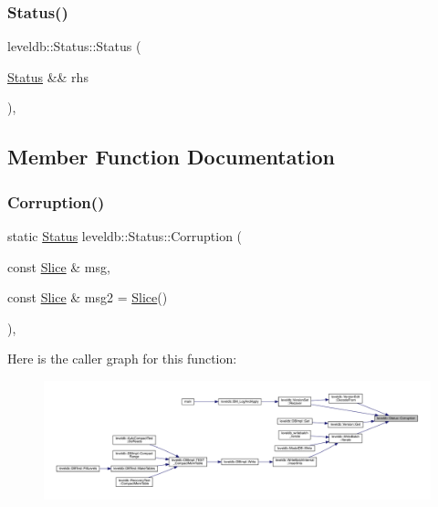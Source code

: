 \subsubsection{\texorpdfstring{Status()}{Status()}\hspace{0.1cm}{\footnotesize\ttfamily [3/3]}}
{\footnotesize\ttfamily leveldb\+::\+Status\+::\+Status (\begin{DoxyParamCaption}\item[{\mbox{\hyperlink{classleveldb_1_1_status}{Status}} \&\&}]{rhs }\end{DoxyParamCaption})\hspace{0.3cm}{\ttfamily [inline]}, {\ttfamily [noexcept]}}



\subsection{Member Function Documentation}
\mbox{\label{classleveldb_1_1_status_a755b1ee5b0029cf9ea1128f1cdff5855}} 
\subsubsection{\texorpdfstring{Corruption()}{Corruption()}}
{\footnotesize\ttfamily static \mbox{\hyperlink{classleveldb_1_1_status}{Status}} leveldb\+::\+Status\+::\+Corruption (\begin{DoxyParamCaption}\item[{const \mbox{\hyperlink{classleveldb_1_1_slice}{Slice}} \&}]{msg,  }\item[{const \mbox{\hyperlink{classleveldb_1_1_slice}{Slice}} \&}]{msg2 = {\ttfamily \mbox{\hyperlink{classleveldb_1_1_slice}{Slice}}()} }\end{DoxyParamCaption})\hspace{0.3cm}{\ttfamily [inline]}, {\ttfamily [static]}}

Here is the caller graph for this function\+:
\nopagebreak
\begin{figure}[H]
\begin{center}
\leavevmode
\includegraphics[width=350pt]{classleveldb_1_1_status_a755b1ee5b0029cf9ea1128f1cdff5855_icgraph}
\end{center}
\end{figure}
\mbox{\label{classleveldb_1_1_status_aefef9f88d0a6ca6d34bd9dec1670309e}} 

